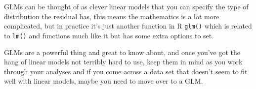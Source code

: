 \documentclass[
]{book}
\begin{document}
GLMs can be thought of as clever linear models that you can specify the type of distribution the residual has, this means the mathematics is a lot more complicated, but in practice it's just another function in R \texttt{glm()} which is related to \texttt{lm()} and functions much like it but has some extra options to set.

GLMs are a powerful thing and great to know about, and once you've got the hang of linear models not terribly hard to use, keep them in mind as you work through your analyses and if you come across a data set that doesn't seem to fit well with linear models, maybe you need to move over to a GLM.

  
\end{document}
